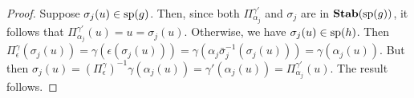 \documentclass[../main/thesis.tex]{subfiles}
\begin{document}
\begin{proof}
  Suppose $\sigma_j (u) \in \text{sp}(g)$. Then, since both
  $\Pi^{\gamma'}_{\alpha_j}$ and $\sigma_j$ are in $\text{\textbf{Stab}} (\text{sp} (g))$, it follows that
  $\Pi^{\gamma'}_{\alpha_j}(u) = u = \sigma_j(u)$. Otherwise, we have $\sigma_j
  (u) \in \text{sp}(h)$. Then $\Pi^{\gamma}_{\epsilon} (\sigma_j (u)) = \gamma
  (\epsilon (\sigma_j(u))) = \gamma(\alpha_j \bar{\sigma}^{-1}_j (\sigma_j (u)))
  = \gamma(\alpha_j (u))$. But then $\sigma_j (u) =
  (\Pi^{\gamma}_{\epsilon})^{-1} \gamma (\alpha_j(u)) = \gamma' (\alpha_j(u)) =
  \Pi^{\gamma'}_{\alpha_j} (u)$. The result follows.
\end{proof}

\end{document}
